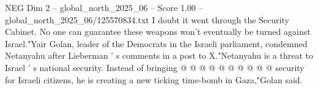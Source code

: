 \begin{textsample}{NEG Dim 2 – global\_north\_2025\_06 – Score 1.00 – global\_north\_2025\_06/125570834.txt}
I doubt it went through the Security Cabinet.
No one can guarantee these weapons won't eventually be turned against Israel."Yair Golan, leader of the Democrats in the Israeli parliament, condemned Netanyahu after Lieberman ' s comments in a post to X."Netanyahu is a threat to Israel ' s national security.
Instead of bringing @ @ @ @ @ @ @ @ @ @ security for Israeli citizens, he is creating a new ticking time-bomb in Gaza,"Golan said.

\end{textsample}
